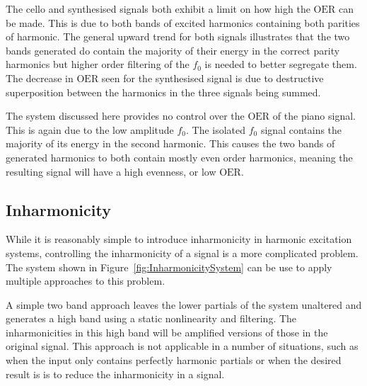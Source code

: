 		The cello and synthesised signals both exhibit a limit on how high the $\mathrm{OER}$ can be made. This
		is due to both bands of excited harmonics containing both parities of harmonic.  The general upward trend
		for both signals illustrates that the two bands generated do contain the majority of their energy in the
		correct parity harmonics but higher order filtering of the $f_{0}$ is needed to better segregate them. The
		decrease in $\mathrm{OER}$ seen for the synthesised signal is due to destructive superposition between
		the harmonics in the three signals being summed.

		The system discussed here provides no control over the $\mathrm{OER}$ of the piano signal. This is again
		due to the low amplitude $f_{0}$. The isolated $f_{0}$ signal contains the majority of its energy in the
		second harmonic. This causes the two bands of generated harmonics to both contain mostly even order
		harmonics, meaning the resulting signal will have a high evenness, or low $\mathrm{OER}$.

	\subsection{Inharmonicity}
	\label{sec:FeatureControl-Parameterisation-Inharmonicity}
		While it is reasonably simple to introduce inharmonicity in harmonic excitation systems, controlling the
		inharmonicity of a signal is a more complicated problem. The system shown in
		Figure~\ref{fig:InharmonicitySystem} can be use to apply multiple approaches to this problem. 

		A simple two band approach leaves the lower partials of the system unaltered and generates a high band
		using a static nonlinearity and filtering. The inharmonicities in this high band will be amplified versions
		of those in the original signal. This approach is not applicable in a number of situations, such as when
		the input only contains perfectly harmonic partials or when the desired result is is to reduce the
		inharmonicity in a signal.
		
